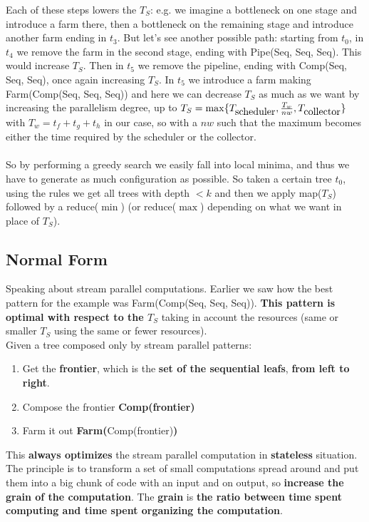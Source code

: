 \documentclass[10pt]{report}
\begin{document}
Each of these steps lowers the $T_S$: e.g. we imagine a bottleneck on one stage and introduce a farm there, then a bottleneck on the remaining stage and introduce another farm ending in $t_3$. But let's see another possible path: starting from $t_0$, in $t_4$ we remove the farm in the second stage, ending with Pipe(Seq, Seq, Seq). This would increase $T_S$. Then in $t_5$ we remove the pipeline, ending with Comp(Seq, Seq, Seq), once again increasing $T_S$. In $t_5$ we introduce a farm making Farm(Comp(Seq, Seq, Seq)) and here we can decrease $T_S$ as much as we want by increasing the parallelism degree, up to $T_S=\max\{T_{\hbox{scheduler}}, \frac{T_w}{nw}, T_{\hbox{collector}}\}$ with $T_w = t_f+t_g+t_h$ in our case, so with a $nw$ such that the maximum becomes either the time required by the scheduler or the collector.\\\\
So by performing a greedy search we easily fall into local minima, and thus we have to generate as much configuration as possible. So taken a certain tree $t_0$, using the rules we get all trees with depth $< k$ and then we apply map($T_S$) followed by a reduce($\min$) (or reduce($\max$) depending on what we want in place of $T_S$).
\subsection{Normal Form}
Speaking about stream parallel computations. Earlier we saw how the best pattern for the example was Farm(Comp(Seq, Seq, Seq)). \textbf{This pattern is optimal with respect to the $T_S$} taking in account the resources (same or smaller $T_S$ using the same or fewer resources).\\
Given a tree composed only by stream parallel patterns:
\begin{enumerate}
	\item Get the \textbf{frontier}, which is the \textbf{set of the sequential leafs}, \textbf{from left to right}.
	\item Compose the frontier \textbf{Comp(frontier)}
	\item Farm it out \textbf{Farm(}Comp(frontier)\textbf{)}
\end{enumerate}
This \textbf{always optimizes} the stream parallel computation in \textbf{stateless} situation. The principle is to transform a set of small computations spread around and put them into a big chunk of code with an input and on output, so \textbf{increase the grain of the computation}. The \textbf{grain} is \textbf{the ratio between time spent computing and time spent organizing the computation}.
\end{document}
